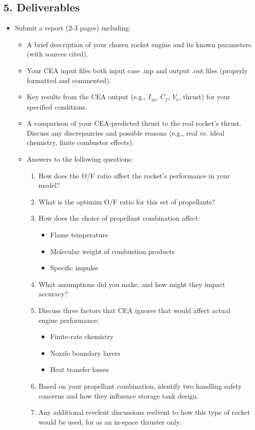 \documentclass[12pt]{article}
\begin{document}
\subsection{5. Deliverables}
\begin{itemize}
    \item Submit a report (2-3 pages) including:
    \begin{itemize}
        \item A brief description of your chosen rocket engine and its known parameters (with sources cited).
        \item Your CEA input files both input case .inp and output .out files (properly formatted and commented).
        \item Key results from the CEA output (e.g., $I_{sp}$, $C_f$, $V_e$, thrust) for your specified conditions.
        \item A comparison of your CEA-predicted thrust to the real rocket's thrust. Discuss any discrepancies and possible reasons (e.g., real vs. ideal chemistry, finite combustor effects).
        \item Answers to the following questions:
        \begin{enumerate}
            \item How does the O/F ratio affect the rocket's performance in your model?
            \item What is the optimim O/F ratio for this set of propellants?
            \item How does the choice of propellant combination affect:
            \begin{itemize}
                \item Flame temperature
                \item Molecular weight of combustion products
                \item Specific impulse
            \end{itemize}
            \item What assumptions did you make, and how might they impact accuracy?
            \item Discuss three factors that CEA ignores that would affect actual engine performance:
            \begin{itemize}
                \item Finite-rate chemistry
                \item Nozzle boundary layers
                \item Heat transfer losses
            \end{itemize}
            \item Based on your propellant combination, identify two handling safety concerns and how they influence storage tank design.
            \item Any additional revelent discussions reelvent to how this type of rocket would be used, for as an in-space thruster only.
        \end{enumerate}
    \end{itemize}
\end{itemize}
\end{document}
